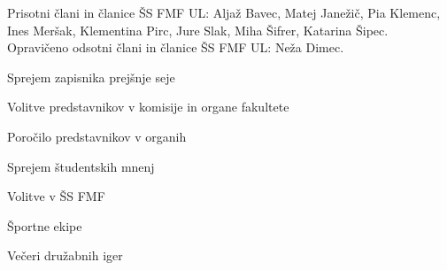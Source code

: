 \documentclass{seja}
\begin{document}
Prisotni člani in članice ŠS FMF UL:
Aljaž Bavec,
Matej Janežič,
Pia Klemenc,
Ines Meršak,
Klementina Pirc,
Jure Slak,
Miha Šifrer,
Katarina Šipec.
\\
Opravičeno odsotni člani in članice ŠS FMF UL: Neža Dimec.

\begin{red*}
  \item Sprejem zapisnika prejšnje seje
  \item Volitve predstavnikov v komisije in organe fakultete
  \item Poročilo predstavnikov v organih
  \item Sprejem študentskih mnenj
  \item Volitve v ŠS FMF
  \item Športne ekipe
  \item Večeri družabnih iger
\end{red*}
\end{document}
